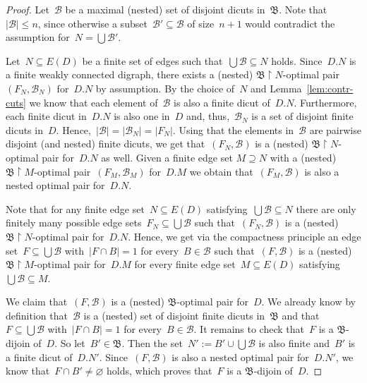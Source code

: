 \documentclass[reqno, 12pt]{amsart}
\numberwithin{equation}{section}
\numberwithin{figure}{section}
\let\emptyset=\varnothing
\theoremstyle{plain}
\theoremstyle{definition}
\newcommand{\restricted}{\ensuremath{{\upharpoonright}}}
\newcommand{\abs}[1]{\ensuremath{{\lvert {#1} \rvert}}}
\begin{document}
\begin{proof}
    Let~$\mathcal{B}$ be a maximal (nested) set of disjoint dicuts in~$\mathfrak{B}$. 
    Note that~${\abs{\mathcal{B}} \leq n}$, since otherwise a subset~${\mathcal{B}' \subseteq \mathcal{B}}$ of size~${n+1}$ would contradict the assumption for~${N = \bigcup \mathcal{B}'}$. 
    
    Let~${N \subseteq E(D)}$ be a finite set of edges such that~${\bigcup \mathcal{B} \subseteq N}$ holds. 
    Since~${D.N}$ is a finite weakly connected digraph, 
    there exists a (nested) ${\mathfrak{B}\restricted{N}}$-optimal pair~${(F_N, \mathcal{B}_N)}$ for~${D.N}$ by assumption. 
    By the choice of~$N$ and Lemma~\ref{lem:contr-cuts} we know that each element of~$\mathcal{B}$ is also a finite dicut of~${D.N}$. 
    Furthermore, each finite dicut in~${D.N}$ is also one in~$D$ and, thus,~${\mathcal{B}_N}$ is a set of disjoint finite dicuts in~$D$. 
    Hence,~${\abs{\mathcal{B}} = \abs{\mathcal{B}_N} = \abs{F_N}}$. 
    Using that the elements in~$\mathcal{B}$ are pairwise disjoint (and nested) finite dicuts, we get that~${(F_N, \mathcal{B})}$ is a (nested) ${\mathfrak{B}\restricted{N}}$-optimal pair for~${D.N}$ as well.
    Given a finite edge set ${M \supseteq N}$ with a (nested) ${\mathfrak{B}\restricted{M}}$-optimal pair~${(F_M, \mathcal{B}_M)}$ for~${D.M}$ we obtain that~${(F_M, \mathcal{B})}$ is also a nested optimal pair for~${D.N}$. 
    
    Note that for any finite edge set~${N \subseteq E(D)}$ satisfying~${\bigcup \mathcal{B} \subseteq N}$ there are only finitely many possible edge sets~${F_N \subseteq \bigcup \mathcal{B}}$ such that~${(F_N, \mathcal{B})}$ is a (nested) ${\mathfrak{B}\restricted{N}}$-optimal pair for~${D.N}$.
    Hence, we get via the compactness principle an edge set~${F \subseteq \bigcup \mathcal{B}}$ with~${\abs{F \cap B} = 1}$ for every~${B \in \mathcal{B}}$ such that~${(F, \mathcal{B})}$ is a (nested) ${\mathfrak{B}\restricted{M}}$-optimal pair for~${D.M}$ for every finite edge set~${M \subseteq E(D)}$ satisfying~${\bigcup \mathcal{B} \subseteq M}$. 
    
    We claim that~${(F, \mathcal{B})}$ is a (nested) $\mathfrak{B}$-optimal pair for~$D$.
    We already know by definition that~$\mathcal{B}$ is a (nested) set of disjoint finite dicuts in~$\mathfrak{B}$ 
    and that~${F \subseteq \bigcup \mathcal{B}}$ with~${\abs{F \cap B} = 1}$ for every~${B \in \mathcal{B}}$. 
    It remains to check that~$F$ is a $\mathfrak{B}$-dijoin of~$D$. 
    So let~${B' \in \mathfrak{B}}$. 
    Then the set~${N' := B' \cup \bigcup \mathcal{B}}$ is also finite and~$B'$ is a finite dicut of~${D.N'}$.
    Since~${(F, \mathcal{B})}$ is also a nested optimal pair for~${D.N'}$, we know that~${F \cap B' \neq \emptyset}$ holds, which proves that~$F$ is a $\mathfrak{B}$-dijoin of~$D$. 
\end{proof}
\end{document}
